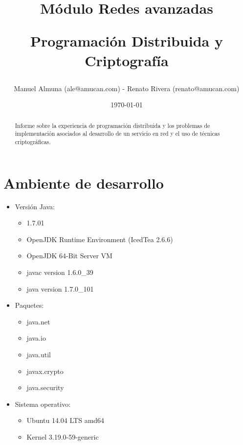 \documentclass[letter, 10pt]{article}
\begin{document}
\title{Módulo Redes avanzadas \\ \begin{Large}Programación Distribuida y Criptografía\end{Large}}
\author{Manuel Almuna (ale@amucan.com) - Renato Rivera (renato@amucan.com)}
\date{\today}
\maketitle

\begin{abstract}
Informe sobre la experiencia de programación distribuida y 	
los problemas de implementación asociados al desarrollo de un servicio en red y	el	
uso de técnicas criptográficas.

\end{abstract}
\section{Ambiente de desarrollo}
\begin{itemize}
  \item Versión Java: 
  \begin{itemize}
    \item 1.7.01
    \item OpenJDK Runtime Environment (IcedTea 2.6.6)
    \item OpenJDK 64-Bit Server VM
    \item javac version 1.6.0\_39
    \item java version 1.7.0\_101
  \end{itemize}
  \item Paquetes:
  \begin{itemize}
    \item java.net
    \item java.io
    \item java.util
    \item javax.crypto
    \item java.security
  \end{itemize} 
  \item Sistema operativo: 
  \begin{itemize}
    \item Ubuntu 14.04 LTS amd64 
    \item Kernel 3.19.0-59-generic
    \end{itemize}
\end{itemize}
\end{document}

